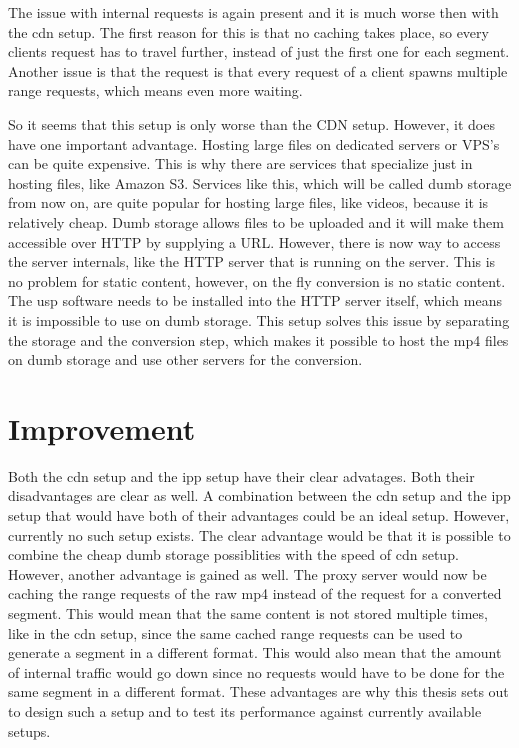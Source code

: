 \documentclass[twoside,openright]{uva-bachelor-thesis}
\begin{document}
The issue with internal requests is again present and it is much worse then with
the \gls{cdn} setup. The first reason for this is that no caching takes place,
so every clients request has to travel further, instead of just the first one
for each segment. Another issue is that the request is that every request of a
client spawns multiple range requests, which means even more waiting.

So it seems that this setup is only worse than the CDN setup. However, it does
have one important advantage. Hosting large files on dedicated servers or VPS’s
can be quite expensive. This is why there are services that specialize just in
hosting files, like Amazon S3. Services like this, which will be called dumb
storage from now on, are quite popular for hosting large files, like videos,
because it is relatively cheap. Dumb storage allows files to be uploaded and it
will make them accessible over HTTP by supplying a URL\@. However, there is now
way to access the server internals, like the HTTP server that is running on the
server. This is no problem for static content, however, on the fly conversion is
no static content. The \gls{usp} software needs to be installed into the HTTP
server itself, which means it is impossible to use on dumb storage. This setup
solves this issue by separating the storage and the conversion step, which makes
it possible to host the mp4 files on dumb storage and use other servers for the
conversion.

\section{Improvement}
Both the \gls{cdn} setup and the \gls{ipp} setup have their clear advatages.
Both their disadvantages are clear as well. A combination between the \gls{cdn}
setup and the \gls{ipp} setup that would have both of their advantages could be
an ideal setup. However, currently no such setup exists. The clear advantage
would be that it is possible to combine the cheap dumb storage possiblities with
the speed of \gls{cdn} setup. However, another advantage is gained as well. The
proxy server would now be caching the range requests of the raw mp4 instead of
the request for a converted segment. This would mean that the same content
is not stored multiple times, like in the \gls{cdn} setup, since the same cached
range requests can be used to generate a segment in a different format.  This
would also mean that the amount of internal traffic would go down since no
requests would have to be done for the same segment in a different format. These
advantages are why this thesis sets out to design such a setup and to test its
performance against currently available setups.
\end{document}
